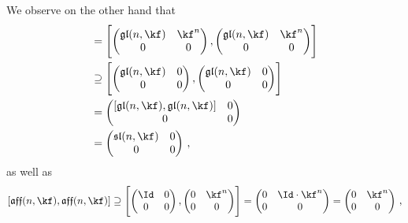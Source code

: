 \begin{example}
\begin{enumerate}
			We observe on the other hand that
			\begin{align*}
				[ \afflie(n, \kf), \afflie(n, \kf) ]
				&=
				\Biggl[
					\begin{pmatrix}
						\gllie(n, \kf)  & \kf^n \\
						0               & 0
					\end{pmatrix}
					,
					\begin{pmatrix}
						\gllie(n, \kf)  & \kf^n \\
						0               & 0
					\end{pmatrix}
				\Biggr]
				\\
				&\supseteq
				\Biggl[
					\begin{pmatrix}
						\gllie(n, \kf)  & 0 \\
						0               & 0
					\end{pmatrix}
					,
					\begin{pmatrix}
						\gllie(n, \kf)  & 0 \\
						0               & 0
					\end{pmatrix}
				\Biggr]
				\\
				&=
				\begin{pmatrix}
					[ \gllie(n, \kf), \gllie(n, \kf) ]  & 0  \\
					0                                   & 0
				\end{pmatrix}
				\\
				&=
				\begin{pmatrix}
					\sllie(n, \kf)  & 0 \\
					0               & 0
				\end{pmatrix} \,,
			\end{align*}
			as well as
			\[
				[ \afflie(n, \kf), \afflie(n, \kf) ]
				\supseteq
				\Biggl[
					\begin{pmatrix}
						\Id & 0 \\
						0   & 0
					\end{pmatrix}
					,
					\begin{pmatrix}
						0 & \kf^n \\
						0 & 0
					\end{pmatrix}
				\Biggr]
				=
				\begin{pmatrix}
					0 & \Id \cdot \kf^n \\
					0 & 0
				\end{pmatrix}
				=
				\begin{pmatrix}
					0 & \kf^n \\
					0 & 0
				\end{pmatrix} \,,
\]
\end{enumerate}
\end{example}
